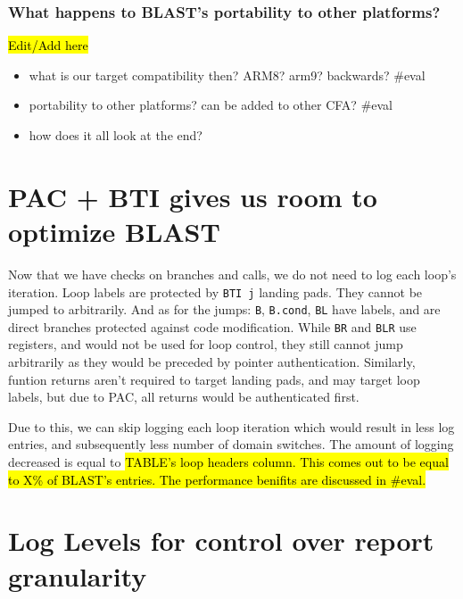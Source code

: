 \documentclass[a4paper, nobind]{templates/ociamthesis}
\providecommand{\tightlist}{%
  \setlength{\itemsep}{0pt}\setlength{\parskip}{0pt}}
\begin{document}
\subsubsection{What happens to BLAST's portability to other platforms?}\label{what-happens-to-blasts-portability-to-other-platforms}

\hl{Edit/Add here}

\begin{itemize}
\tightlist
\item
  what is our target compatibility then?
  ARM8? arm9? backwards? \#eval
\item
  portability to other platforms? can be added to other CFA? \#eval
\item
  how does it all look at the end?
\end{itemize}

\section{PAC + BTI gives us room to optimize BLAST}\label{pac-bti-gives-us-room-to-optimize-blast}

Now that we have checks on branches and calls, we do not need to log each loop's iteration.
Loop labels are protected by \texttt{BTI\ j} landing pads. They cannot be jumped to arbitrarily.
And as for the jumps: \texttt{B}, \texttt{B.cond}, \texttt{BL} have labels, and are direct branches protected
against code modification.
While \texttt{BR} and \texttt{BLR} use registers, and would not be used for loop control,
they still cannot jump arbitrarily as they would be preceded by pointer authentication.
Similarly, funtion returns aren't required to target landing pads, and may target loop labels,
but due to PAC, all returns would be authenticated first.

Due to this, we can skip logging each loop iteration which would result in less
log entries, and subsequently less number of domain switches. The amount of logging
decreased is equal to \hl{TABLE's loop headers column. This comes out to be
equal to X\% of BLAST's entries. The performance benifits are discussed in \#eval.}

\section{Log Levels for control over report granularity}\label{log-levels-for-control-over-report-granularity}
\end{document}

